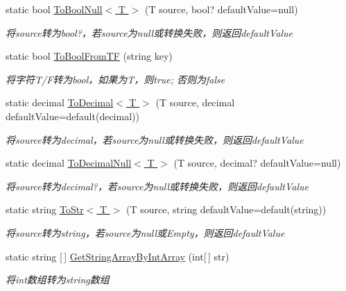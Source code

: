 \begin{DoxyCompactItemize}
static bool \hyperlink{class_x_c_l_net_tools_1_1_common_1_1_data_type_convert_a6b352692822b65973ac2f193aa1f7f7e}{To\+Bool\+Null$<$ T $>$} (T source, bool? default\+Value=null)
\begin{DoxyCompactList}\small\item\em 将source转为bool?，若source为null或转换失败，则返回default\+Value \end{DoxyCompactList}\item 
static bool \hyperlink{class_x_c_l_net_tools_1_1_common_1_1_data_type_convert_addd3068d336ba1a73e020e456d93e239}{To\+Bool\+From\+TF} (string key)
\begin{DoxyCompactList}\small\item\em 将字符\+T/\+F转为bool，如果为\textquotesingle{}T\textquotesingle{}，则true; 否则为false \end{DoxyCompactList}\item 
static decimal \hyperlink{class_x_c_l_net_tools_1_1_common_1_1_data_type_convert_aed8222be8178bb287242a97c48c82aa1}{To\+Decimal$<$ T $>$} (T source, decimal default\+Value=default(decimal))
\begin{DoxyCompactList}\small\item\em 将source转为decimal，若source为null或转换失败，则返回default\+Value \end{DoxyCompactList}\item 
static decimal \hyperlink{class_x_c_l_net_tools_1_1_common_1_1_data_type_convert_ae28621f38712dd3b9cd484681dc74640}{To\+Decimal\+Null$<$ T $>$} (T source, decimal? default\+Value=null)
\begin{DoxyCompactList}\small\item\em 将source转为decimal?，若source为null或转换失败，则返回default\+Value \end{DoxyCompactList}\item 
static string \hyperlink{class_x_c_l_net_tools_1_1_common_1_1_data_type_convert_a2a23ae0b4ca4ac0329c93697dc0b5fd6}{To\+Str$<$ T $>$} (T source, string default\+Value=default(string))
\begin{DoxyCompactList}\small\item\em 将source转为string，若source为null或\+Empty，则返回default\+Value \end{DoxyCompactList}\item 
static string \mbox{[}$\,$\mbox{]} \hyperlink{class_x_c_l_net_tools_1_1_common_1_1_data_type_convert_a4c641616a2414eeb45ee4e89390faf1b}{Get\+String\+Array\+By\+Int\+Array} (int\mbox{[}$\,$\mbox{]} str)
\begin{DoxyCompactList}\small\item\em 将int数组转为string数组 \end{DoxyCompactList}\item 

\end{DoxyCompactItemize}
